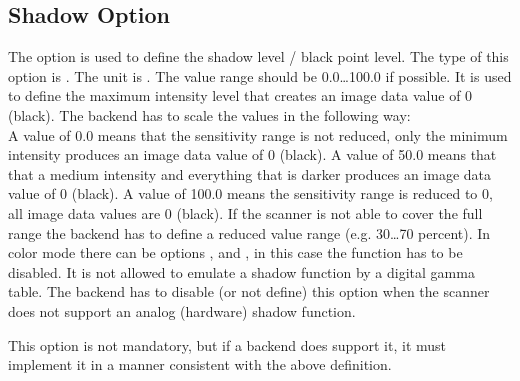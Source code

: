 \documentclass[11pt,DVIps]{report}
\begin{document}
\begin{changebar}
\subsection{Shadow Option}
The option  is used to define the shadow level / black point level.
The type of this option is .
The unit is . The value range
should be 0.0\ldots100.0 if possible.
It is used to define the maximum intensity level that creates an image data value
of 0 (black).  The backend has to scale the values in the following way:\\
A value of 0.0 means that the sensitivity range is not reduced, only the
minimum intensity produces an image data value of 0 (black).
A value of 50.0 means that that a medium intensity and everything that is darker
produces an image data value of 0 (black).
A value of 100.0 means the sensitivity range is reduced to 0, all image
data values are 0 (black).  If the scanner is not able to
cover the full range the backend has to define a reduced
value range (e.g. 30\ldots70 percent).
In color mode there can be options , 
and , in this case the  function has to be disabled.
It is not allowed to emulate a shadow function by
a digital gamma table. The backend has to disable (or not
define) this option when the scanner does not support an
analog (hardware) shadow function.

This option is not mandatory, but if a backend does support it, it
must implement it in a manner consistent with the above definition.\\
\end{changebar}
\end{document}
